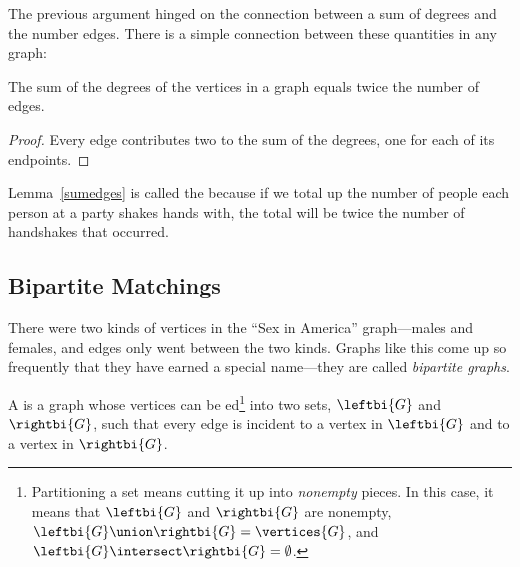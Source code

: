 The previous argument hinged on the connection between a sum of
degrees and the number edges.  There is a simple connection between
these quantities in any graph:
\begin{lemma}\label{sumedges}
The sum of the degrees of the vertices in a graph equals twice the
number of edges.
\end{lemma}

\begin{proof}
Every edge contributes two to the sum of the degrees, one for each of
its endpoints.
\end{proof}

Lemma~\ref{sumedges} is called the  because if
we total up the number of people each person at a party shakes hands
with, the total will be twice the number of handshakes that occurred.

\subsection{Bipartite Matchings}\label{bipartitesec}


There were two kinds of vertices in the ``Sex in America''
graph---males and females, and edges only went between the two kinds.
Graphs like this come up so frequently that they have earned a special
name---they are called \emph{bipartite graphs}.

\begin{definition}
  A   is a graph whose vertices can be
  ed\footnote{Partitioning a set means cutting it up into
    \emph{nonempty} pieces.  In this case, it means that $\leftbi{G}$ and
    $\rightbi{G}$ are nonempty, $\leftbi{G} \union \rightbi{G} =
    \vertices{G}$, and $\leftbi{G} \intersect \rightbi{G} =
    \emptyset$.} into two sets, $\leftbi{G}$ and
    $\rightbi{G}$, such that every edge is incident to a vertex in
    $\leftbi{G}$ and to a vertex in $\rightbi{G}$.
\end{definition}

\begin{editingnotes}
\end{editingnotes}

